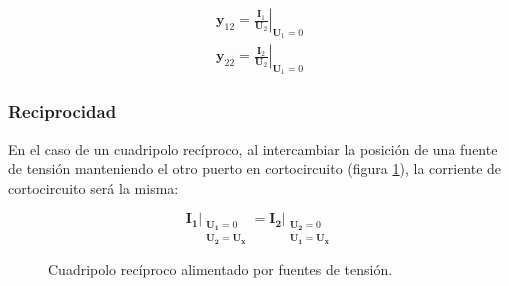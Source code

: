 \[
  \begin{array}{c}
    \mathbf{y}_{12} = \left.\frac{\mathbf{I}_1}{\mathbf{U}_2}\right\rvert_{\mathbf{U}_1 = 0}\\
    \mathbf{y}_{22} = \left.\frac{\mathbf{I}_2}{\mathbf{U}_2}\right\rvert_{\mathbf{U}_1 = 0}
  \end{array}
\]


\subsubsection{Reciprocidad}

En el caso de un cuadripolo recíproco, al intercambiar la posición de
una fuente de tensión manteniendo el otro puerto en cortocircuito
(figura \ref{fig:admitancia-reciprocidad}), la corriente de
cortocircuito será la misma:

\[
  \mathbf{I_1}\rvert_{
    \begin{array}{l}
      \mathbf{U_1} = 0 \\ \mathbf{U_2} = \mathbf{U_x}
    \end{array}
  } =%
  \mathbf{I_2}\rvert_{
    \begin{array}{l}
      \mathbf{U_2} = 0 \\ \mathbf{U_1} = \mathbf{U_x}
    \end{array}
  }
\]

\begin{figure}[H]
  \centering {}\hspace{2cm}
  \caption{Cuadripolo recíproco alimentado por fuentes de tensión.}
  \label{fig:admitancia-reciprocidad}
\end{figure}

